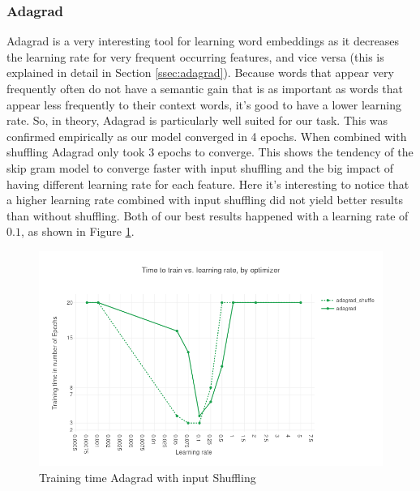 \subsubsection{Adagrad}
Adagrad \cite{adagrad} is a very interesting tool for learning word embeddings as it decreases the learning rate for very frequent occurring features, and vice versa (this is explained in detail in Section \ref{ssec:adagrad}). Because words that appear very frequently often do not have a semantic gain that is as important as words that appear less frequently to their context words, it's good to have a lower learning rate. So, in theory, Adagrad is particularly well suited for our task. This was confirmed empirically as our model converged in 4 epochs. When combined with shuffling Adagrad only took 3 epochs to converge. This shows the tendency of the skip gram model to converge faster with input shuffling and the big impact of having different learning rate for each feature.
Here it's interesting to notice that a higher learning rate combined with input shuffling did not yield better results than without shuffling. Both of our best results happened with a learning rate of $0.1$, as shown in Figure \ref{fig:results_adagrad_shuffle}.
\begin{figure}[h]
\centering
\includegraphics[scale=0.45]{images/results_adagrad_shuffle}
\caption{Training time Adagrad with input Shuffling}
\label{fig:results_adagrad_shuffle}
\end{figure}
